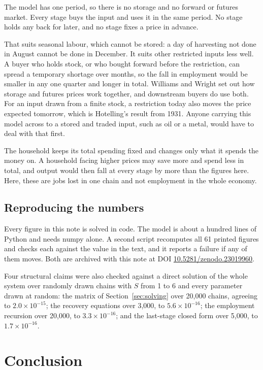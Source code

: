 \documentclass[11pt,a4paper]{article}
\begin{document}
The model has one period, so there is no storage and no forward or futures market. Every stage buys the input and uses it in the same period. No stage holds any back for later, and no stage fixes a price in advance.

That suits seasonal labour, which cannot be stored: a day of harvesting not done in August cannot be done in December. It suits other restricted inputs less well. A buyer who holds stock, or who bought forward before the restriction, can spread a temporary shortage over months, so the fall in employment would be smaller in any one quarter and longer in total. Williams and Wright set out how storage and futures prices work together, and downstream buyers do use both. For an input drawn from a finite stock, a restriction today also moves the price expected tomorrow, which is Hotelling's result from 1931. Anyone carrying this model across to a stored and traded input, such as oil or a metal, would have to deal with that first.

The household keeps its total spending fixed and changes only what it spends the money on. A household facing higher prices may save more and spend less in total, and output would then fall at every stage by more than the figures here. Here, these are jobs lost in one chain and not employment in the whole economy.

\subsection{Reproducing the numbers}

Every figure in this note is solved in code. The model is about a hundred lines of Python and needs numpy alone. A second script recomputes all 61 printed figures and checks each against the value in the text, and it reports a failure if any of them moves. Both are archived with this note at DOI \href{https://doi.org/10.5281/zenodo.23019960}{10.5281/zenodo.23019960}.

Four structural claims were also checked against a direct solution of the whole system over randomly drawn chains with $S$ from 1 to 6 and every parameter drawn at random: the matrix of Section~\ref{sec:solving} over 20,000 chains, agreeing to $2.0 \times 10^{-15}$; the recovery equations over 3,000, to $5.6 \times 10^{-16}$; the employment recursion over 20,000, to $3.3 \times 10^{-16}$; and the last-stage closed form over 5,000, to $1.7 \times 10^{-16}$.

\section{Conclusion}
\label{sec:conc}
\end{document}
